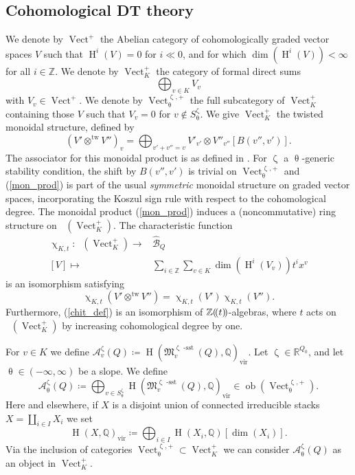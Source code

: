 \documentclass{amsart}
\DeclareMathOperator{\Vect}{Vect}
\DeclareMathOperator{\tw}{tw}
\DeclareMathOperator{\sst}{-sst}
\DeclareMathOperator{\KK}{K_0}
\newcommand{\Mst}{\mathfrak{M}}
\DeclareMathOperator{\HO}{H}
\DeclareMathOperator{\vir}{vir}
\newcommand{\lcbs}{(\!(}
\newcommand{\rcbs}{)\!)}
\DeclareMathOperator{\ob}{ob}
\def\!{\mskip-\thinmuskip}
\let\s=\mathcal
\renewcommand{\theta}{\uptheta}
\renewcommand{\zeta}{\upzeta}
\renewcommand{\chi}{\upchi}
\theoremstyle{plain}%
\theoremstyle{definition}
\theoremstyle{remark}
\begin{document}
\subsection{Cohomological DT theory}
\label{coh_DT_sec}
We denote by $\Vect^+$ the Abelian category of cohomologically graded vector spaces $V$ such that $\HO^i(V)=0$ for $i\ll 0$, and for which $\dim(\HO^i(V))< \infty$ for all $i\in \mathbb{Z}$.  We denote by $\Vect^+_{K}$ the category of formal direct sums
\[
\bigoplus_{v\in K}V_{v}
\]
with $V_{v}\in \Vect^+$. 
 We denote by $\Vect^{\zeta,+}_{\theta}$ the full subcategory of $\Vect_{K}^+$ containing those $V$ such that $V_v=0$ for $v\notin S_{\theta}^{\zeta}$.  We give $\Vect_K^+$ the twisted monoidal structure, defined by
\begin{equation}
\label{mon_prod}    
(V'\otimes^{\tw}V'')_{v}=\bigoplus_{v'+v''=v}V'_{v'}\otimes V''_{v''}[B( v'',v')].
\end{equation}
The associator for this monoidal product is as defined in \cite[Sec 3.2]{DavMei}.  For $\zeta$ a $\theta$-generic stability condition, the shift by $B(v'',v')$ is trivial on $\Vect^{\zeta,+}_{\theta}$ and (\ref{mon_prod}) is part of the usual \textit{symmetric} monoidal structure on graded vector spaces, incorporating the Koszul sign rule with respect to the cohomological degree.  The monoidal product (\ref{mon_prod}) induces a (noncommutative) ring structure on $\KK(\Vect^+_{K})$.  The characteristic function
\begin{align}
\label{chit_def}
\chi_{K,t}\colon \KK(\Vect^+_{K})\rightarrow &\hat{\mathscr{B}}_Q\\
[V]\mapsto &\sum_{i\in\mathbb{Z}}\sum_{v\in K}\dim(\HO^i(V_{v}))t^ix^v \nonumber
\end{align}
is an isomorphism satisfying
\[
\chi_{K,t}(V'\otimes^{\tw} V'')=\chi_{K,t}(V')\chi_{K,t}(V'').
\]
Furthermore, (\ref{chit_def}) is an isomorphism of $\mathbb{Z}\lcbs t\rcbs$-algebras, where $t$ acts on $\KK(\Vect^{+}_K)$ by increasing cohomological degree by one.

For $v\in K$ we define $\s{A}_v^{\zeta}(Q)\coloneqq \HO\left(\Mst^{\zeta\sst}_v(Q),\mathbb{Q}\right)_{\vir}$.  Let $\zeta\in \mathbb{R}^{Q_0}$, and let $\theta\in (-\infty,\infty)$ be a slope.  We define
\[
\mathcal{A}_{\theta}^{\zeta}(Q)\coloneqq \bigoplus_{v\in S_{\theta}^{\zeta}}\HO\left(\Mst^{\zeta\sst}_v(Q),\mathbb{Q}\right)_{\vir}\in \ob(\Vect^{\zeta,+}_{\theta}).
\]
Here and elsewhere, if $X$ is a disjoint union of connected irreducible stacks $X=\coprod_{i\in I} X_i$ we set 
\[
\HO(X,\mathbb{Q})_{\vir}\coloneqq \bigoplus_{i\in I}\HO\left(X_i,\mathbb{Q}\right)[\dim(X_i)].
\]
Via the inclusion of categories $\Vect_{\theta}^{\zeta,+}\subset \Vect_K^+$ we can consider $\mathcal{A}_{\theta}^{\zeta}(Q)$ as an object in $\Vect_K^+$.  
\end{document}
